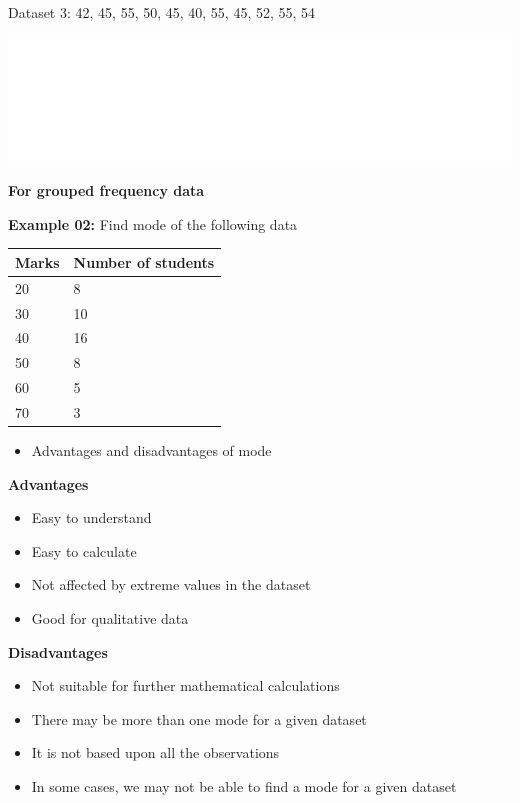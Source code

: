 \documentclass[]{book}
\providecommand{\tightlist}{%
  \setlength{\itemsep}{0pt}\setlength{\parskip}{0pt}}
\begin{document}
Dataset 3: 42, 45, 55, 50, 45, 40, 55, 45, 52, 55, 54

\begin{center}\includegraphics[width=1\linewidth]{figure/mode3-1} \end{center}

\textbf{For grouped frequency data}

\textbf{Example 02:} Find mode of the following data

\begin{longtable}[]{@{}ll@{}}
\toprule
Marks & Number of students\tabularnewline
\midrule
\endhead
20 & 8\tabularnewline
30 & 10\tabularnewline
40 & 16\tabularnewline
50 & 8\tabularnewline
60 & 5\tabularnewline
70 & 3\tabularnewline
\bottomrule
\end{longtable}

\begin{itemize}
\tightlist
\item
  Advantages and disadvantages of mode
\end{itemize}

\textbf{Advantages}

\begin{itemize}
\tightlist
\item
  Easy to understand
\item
  Easy to calculate
\item
  Not affected by extreme values in the dataset
\item
  Good for qualitative data
\end{itemize}

\textbf{Disadvantages}

\begin{itemize}
\tightlist
\item
  Not suitable for further mathematical calculations
\item
  There may be more than one mode for a given dataset
\item
  It is not based upon all the observations
\item
  In some cases, we may not be able to find a mode for a given dataset
\end{itemize}
\end{document}
